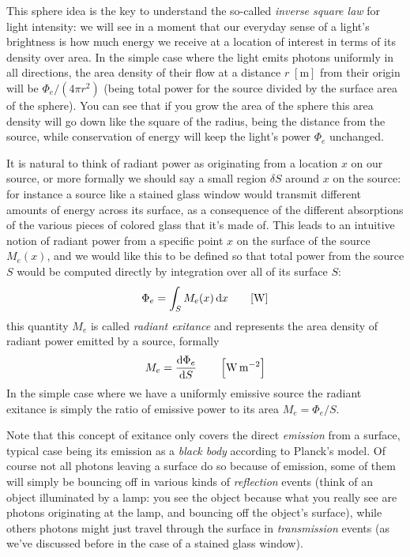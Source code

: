 This sphere idea is the key to understand the so-called \textsl{inverse square law}
for light intensity: we will see in a moment that our everyday sense of a light's brightness
is how much energy we receive at a location of interest in terms of its density over area.
In the simple case where the light emits photons uniformly in all directions, the area density
of their flow at a distance $r\;[\unit\meter]$ from their origin will be $\Phi_e / (4\pi r^2)$ 
(being total power for the source divided by the surface area of the sphere). 
You can see that if you grow the area of the sphere this area density will go down 
like the square of the radius, being the distance from the source, 
while conservation of energy will keep the light's power $\Phi_e$ unchanged.

It is natural to think of radiant power as originating from a location $x$ on our source,
or more formally we should say a small region $\delta S$ around $x$ on the source:
for instance a source like a stained glass window would transmit different amounts of energy 
across its surface, as a consequence of the different absorptions of the various pieces of
colored glass that it's made of. 
This leads to an intuitive notion of radiant power from a specific point $x$ on the surface 
of the source $M_e(x)$, and we would like this to be defined so that total power 
from the source $S$ would be computed directly by integration over all of its surface $S$:
\begin{displaymath}
	\Phi_e = \int_{S} M_e(x) \d x \qquad [\unit{\watt}]
\end{displaymath}
this quantity $M_e$ is called \textsl{radiant exitance} and represents the area density
of radiant power emitted by a source, formally
\begin{displaymath}
	M_e = \frac{\d\Phi_e}{\d S} \qquad \left[\unit{\watt\per\square\meter}\right]
\end{displaymath}
In the simple case where we have a uniformly emissive source the
radiant exitance is simply the ratio of emissive power to its area
$M_e = \Phi_e / S$.

Note that this concept of exitance only covers the direct \textsl{\gls{emission}} from a surface,
typical case being its emission as a \textsl{\gls{black body}} according to Planck's model.
Of course not all photons leaving a surface do so because of emission, some of them
will simply be bouncing off in various kinds of \textsl{\gls{reflection}} events (think
of an object illuminated by a lamp: you see the object because what you really see are
photons originating at the lamp, and bouncing off the object's surface), 
while others photons might just travel through the surface in \textsl{\gls{transmission}} events
(as we've discussed before in the case of a stained glass window).

